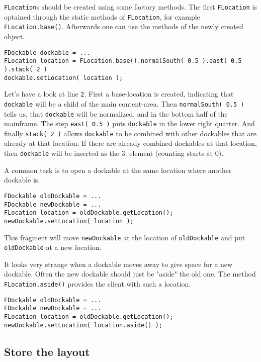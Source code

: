 \documentclass[a4paper,10pt]{article}
\newcommand{\src}[1]{\lstinline[basicstyle=\ttfamily]|#1|}
\begin{document}
\src{FLocation}s should be created using some factory methods. The first \src{FLocation} is optained through the static methods of \src{FLocation}, for example \src{FLocation.base()}. Afterwards one can use the methods of the newly created object.
\begin{lstlisting}
FDockable dockable = ...
FLocation location = FLocation.base().normalSouth( 0.5 ).east( 0.5 ).stack( 2 )
dockable.setLocation( location );
\end{lstlisting}
Let's have a look at line \src{2}. First a base-location is created, indicating that \src{dockable} will be a child of the main content-area. Then \src{normalSouth( 0.5 )} tells us, that \src{dockable} will be normalized, and in the bottom half of the mainframe. The step \src{east( 0.5 )} puts \src{dockable} in the lower right quarter. And finally \src{stack( 2 )} allows \src{dockable} to be combined with other dockables that are already at that location. If there are already combined dockables at that location, then \src{dockable} will be inserted as the 3. element (counting starts at 0).

A common task is to open a dockable at the same location where another dockable is.
\begin{lstlisting}
FDockable oldDockable = ...
FDockable newDockable = ...
FLocation location = oldDockable.getLocation();
newDockable.setLocation( location );
\end{lstlisting}
This fragment will move \src{newDockable} at the location of \src{oldDockable} and put \src{oldDockable} at a new location.

 It looks very strange when a dockable moves away to give space for a new dockable. Often the new dockable should just be "aside" the old one. The method \src{FLocation.aside()} provides the client with such a location.
\begin{lstlisting}
FDockable oldDockable = ...
FDockable newDockable = ...
FLocation location = oldDockable.getLocation();
newDockable.setLocation( location.aside() );
\end{lstlisting}

\subsection{Store the layout}
\end{document}
